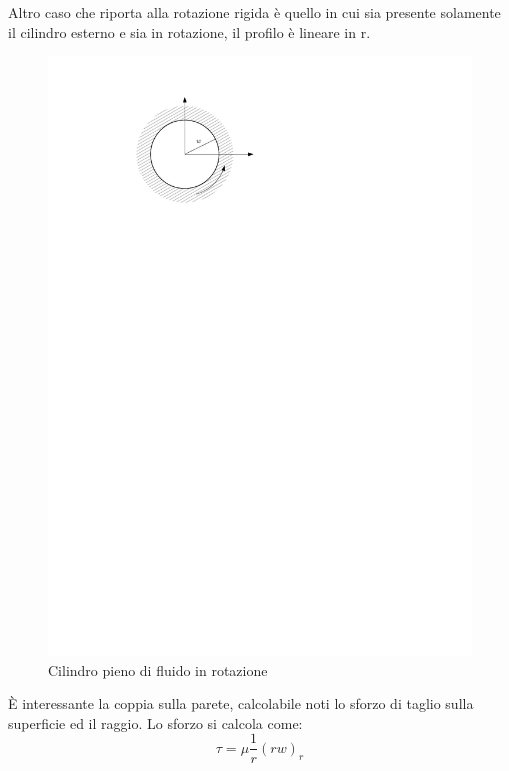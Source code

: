 Altro caso che riporta alla rotazione rigida è quello in cui sia presente solamente il cilindro esterno e sia in rotazione, il profilo è lineare in r.
	\begin{figure}[ht]
		\includegraphics[scale=1.1]{./3.6 Soluzioni esatte equazioni di Navier-Stokes/3.6-7}
		\centering
		\caption{Cilindro pieno di fluido in rotazione}
	\end{figure}
%

È interessante la coppia sulla parete, calcolabile noti lo sforzo di taglio sulla superficie ed il raggio.
Lo sforzo si calcola come:
%
	\begin{equation*}
		\tau = \mu \frac{1}{r} {(rw)}_r
	\end{equation*}
%

